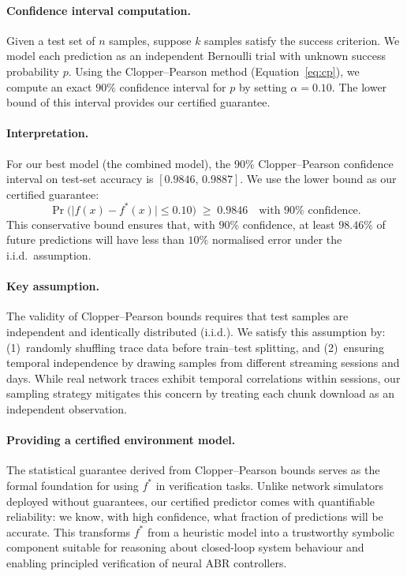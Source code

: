 \documentclass[thesis]{uofithesis} %
\begin{document}
    \paragraph{Confidence interval computation.}
    Given a test set of $n$ samples, suppose $k$ samples satisfy the
    success criterion.  We model each prediction as an independent
    Bernoulli trial with unknown success probability $p$.  Using the
    Clopper--Pearson method (Equation~\ref{eq:cp}), we compute an exact
    $90\%$ confidence interval for $p$ by setting $\alpha = 0.10$.  The
    lower bound of this interval provides our certified guarantee.

    \paragraph{Interpretation.}
    For our best model (the combined model), the $90\%$ Clopper--Pearson
    confidence interval on test-set accuracy is $[0.9846,\, 0.9887]$.  We
    use the lower bound as our certified guarantee:
    \begin{equation}
        \Pr\!\bigl(\lvert f(x) - f^{\ast}(x) \rvert \leq 0.10\bigr)
        \;\geq\; 0.9846
        \quad\text{with $90\%$ confidence.}
        \label{eq:env-certified}
    \end{equation}
    This conservative bound ensures that, with $90\%$ confidence, at least
    $98.46\%$ of future predictions will have less than $10\%$ normalised
    error under the i.i.d.\ assumption.

    \paragraph{Key assumption.}
    The validity of Clopper--Pearson bounds requires that test samples are
    independent and identically distributed (i.i.d.).  We satisfy this
    assumption by: (1)~randomly shuffling trace data before train--test
    splitting, and (2)~ensuring temporal independence by drawing samples
    from different streaming sessions and days.  While real network traces
    exhibit temporal correlations within sessions, our sampling strategy
    mitigates this concern by treating each chunk download as an independent
    observation.

    \paragraph{Providing a certified environment model.}
    The statistical guarantee derived from Clopper--Pearson bounds serves as
    the formal foundation for using $f^{\ast}$ in verification tasks.
    Unlike network simulators deployed without guarantees, our certified
    predictor comes with quantifiable reliability: we know, with high
    confidence, what fraction of predictions will be accurate.  This
    transforms $f^{\ast}$ from a heuristic model into a trustworthy
    symbolic component suitable for reasoning about closed-loop system
    behaviour and enabling principled verification of neural ABR
    controllers.
\end{document}
